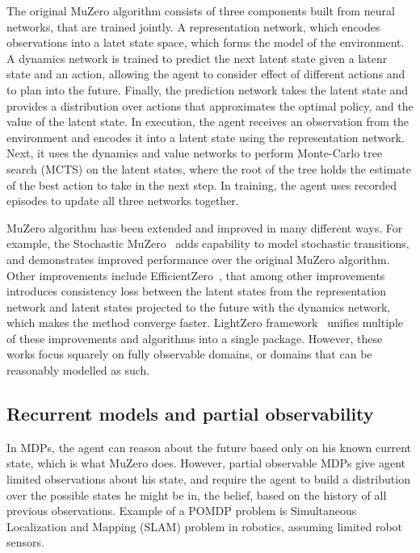 \documentclass[12pt]{article}
\begin{document}
The original MuZero algorithm \cite{schrittwieserMasteringAtariGo2020} consists of three components built from neural networks, that are trained jointly. A representation network, which encodes observations into a latet state space, which forms the model of the environment. 
A dynamics network is trained to predict the next latent state given a latenr state and an action, allowing the agent to consider effect of different actions and to plan into the future. 
Finally, the prediction network takes the latent state and provides a distribution over actions that approximates the optimal policy, and the value of the latent state. In execution, the agent receives an observation from the environment and encodes it into a latent state using the representation network. 
Next, it uses the dynamics and value networks to perform Monte-Carlo tree search (MCTS) on the latent states, where the root of the tree holds the estimate of the best action to take in the next step. 
In training, the agent uses recorded episodes to update all three networks together. 

MuZero algorithm has been extended and improved in many different ways. 
For example, the Stochastic MuZero~\cite{antonoglouPlanningStochasticEnvironments2021} adds capability to model stochastic transitions, and demonstrates improved performance over the original MuZero algorithm. 
Other improvements include EfficientZero~\cite{yeMasteringAtariGames2021}, that among other improvements introduces consistency loss between the latent states from the representation network and latent states projected to the future with the dynamics network, which makes the method converge faster. LightZero framework~\cite{niuLightZeroUnifiedBenchmark2023} unifies multiple of these improvements and algorithms into a single package. 
However, these works focus squarely on fully observable domains, or domains that can be reasonably modelled as such. 

\subsection{Recurrent models and partial observability}
In MDPs, the agent can reason about the future based only on his known current state, which is what MuZero does. However, partial observable MDPs give agent limited observations about his state, and require the agent to build a distribution over the possible states he might be in, the belief, based on the history of all previous observations. Example of a POMDP problem is Simultaneous Localization and Mapping (SLAM) problem in robotics, assuming limited robot sensors. 
\end{document}
